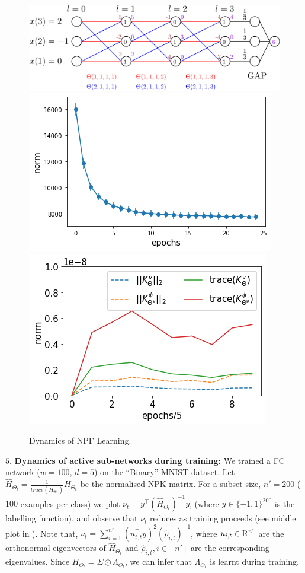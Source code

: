 \documentclass{article}
\begin{document}
\begin{figure}[h]
\centering
\includegraphics[scale=0.23]{figs/gap.png}
\includegraphics[scale=0.23]{figs/path-gram.png}
\includegraphics[scale=0.23]{figs/kvkphi.png}
\caption{Dynamics of NPF Learning. }
\label{fig:dynamics}
\end{figure}


$5.$ \textbf{Dynamics of active sub-networks during training:} We trained a FC network ($w=100$, $d=5$) on the ``Binary''-MNIST dataset. Let $\widehat{H}_{\Theta_t}=\frac{1}{trace(H_{\Theta_t})}H_{\Theta_t}$ be the normalised NPK matrix. For a subset size, $n'=200$ ($100$ examples per class) we plot $\nu_t=y^\top (\widehat{H}_{\Theta_t})^{-1} y$, (where $y\in\{-1,1\}^{200}$ is the labelling function), and observe that $\nu_t$ reduces as training proceeds (see middle plot in ). Note that, $\nu_t=\sum_{i=1}^{n'}(u_{i,t}^\top y)^2 (\hat{\rho}_{i,t})^{-1}$, where $u_{i,t}\in \mathrm{R}^{n'}$ are the orthonormal eigenvectors of $\widehat{H}_{\Theta_t}$ and $\hat{\rho}_{i,t},i\in[n']$ are the corresponding eigenvalues. Since $H_{\Theta_t}=\Sigma\odot \Lambda_{\Theta_t}$, we can infer that $\Lambda_{\Theta_t}$ is learnt during training.
\end{document}
